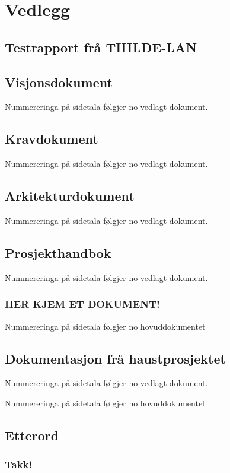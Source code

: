 \documentclass[nynorsk,12pt,a4paper,oneside]{book}
\begin{document}

{}

\part{Vedlegg}
\appendix 
\chapter{Testrapport frå TIHLDE-LAN}
\chapter{Visjonsdokument}
	Nummereringa på sidetala følgjer no vedlagt dokument.
	
	
\chapter{Kravdokument}
	Nummereringa på sidetala følgjer no vedlagt dokument.
	
\chapter{Arkitekturdokument}
	Nummereringa på sidetala følgjer no vedlagt dokument.
  	
\chapter{Prosjekthandbok}
	Nummereringa på sidetala følgjer no vedlagt dokument.
%	
	\section*{HER KJEM ET DOKUMENT!}
	Nummereringa på sidetala følgjer no hovuddokumentet
\chapter{Dokumentasjon frå haustprosjektet}
		Nummereringa på sidetala følgjer no vedlagt dokument.
	
	Nummereringa på sidetala følgjer no hovuddokumentet

\backmatter
\chapter{Etterord}
\section{Takk!}
\end{document}
